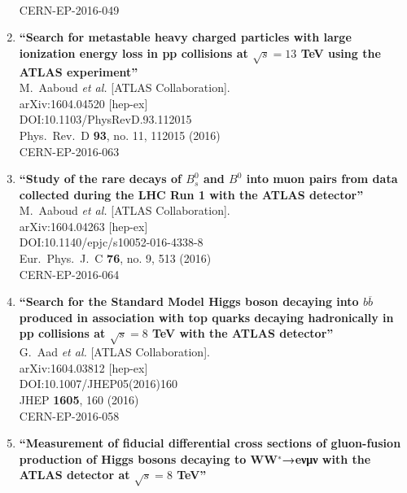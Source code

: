 \documentclass{article}
\begin{document}
\begin{enumerate}
  \\{}CERN-EP-2016-049
\item%
{\bf ``Search for metastable heavy charged particles with large ionization energy loss in pp collisions at $\sqrt{s} = 13$ TeV using the ATLAS experiment''}
  \\{}M.~Aaboud {\it et al.} [ATLAS Collaboration].
  \\{}arXiv:1604.04520 [hep-ex]
  \\{}DOI:10.1103/PhysRevD.93.112015
  \\{}Phys.\ Rev.\ D {\bf 93}, no. 11, 112015 (2016)
  \\{}CERN-EP-2016-063
\item%
{\bf ``Study of the rare decays of $B^0_s$ and $B^0$ into muon pairs from data collected during the LHC Run 1 with the ATLAS detector''}
  \\{}M.~Aaboud {\it et al.} [ATLAS Collaboration].
  \\{}arXiv:1604.04263 [hep-ex]
  \\{}DOI:10.1140/epjc/s10052-016-4338-8
  \\{}Eur.\ Phys.\ J.\ C {\bf 76}, no. 9, 513 (2016)
  \\{}CERN-EP-2016-064
\item%
{\bf ``Search for the Standard Model Higgs boson decaying into $ b\overline{b} $ produced in association with top quarks decaying hadronically in pp collisions at $ \sqrt{s}=8 $ TeV with the ATLAS detector''}
  \\{}G.~Aad {\it et al.} [ATLAS Collaboration].
  \\{}arXiv:1604.03812 [hep-ex]
  \\{}DOI:10.1007/JHEP05(2016)160
  \\{}JHEP {\bf 1605}, 160 (2016)
  \\{}CERN-EP-2016-058
\item%
{\bf ``Measurement of fiducial differential cross sections of gluon-fusion production of Higgs bosons decaying to WW$^{∗}$→eνμν with the ATLAS detector at $ \sqrt{s}=8 $ TeV''}

\end{enumerate}
\end{document}
